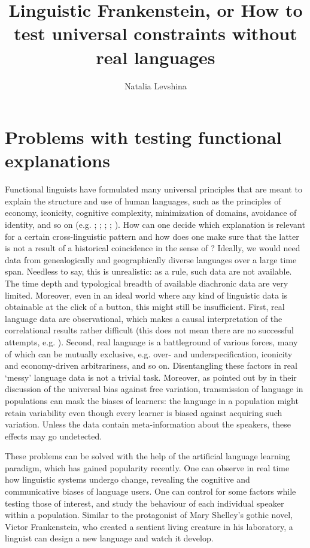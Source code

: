 \documentclass[output=paper]{langsci/langscibook}
\author{Natalia Levshina\affiliation{Leipzig University}}
\title{Linguistic {Frankenstein}, or {How} to test universal constraints without real languages}
\begin{document}
\maketitle 
 

\section{Problems with testing functional explanations}

Functional linguists have formulated many universal principles that are meant to explain the structure and use of human languages, such as the principles of economy, iconicity, cognitive complexity, minimization of domains, avoidance of identity, and so on (e.g. \citealt{Haiman1983}; \citealt{Rohdenburg1996}; \citealt{Rohdenburg2003}; \citealt{Hawkins2004}; \citealt{Haspelmath2008_FreqIcon}). How can one decide which explanation is relevant for a certain cross-linguistic pattern and how does one make sure that the latter is not a result of a historical coincidence in the sense of ? Ideally, we would need data from genealogically and geographically diverse languages over a large time span. Needless to say, this is unrealistic: as a rule, such data are not available. The time depth and typological breadth of available diachronic data are very limited. Moreover, even in an ideal world where any kind of linguistic data is obtainable at the click of a button, this might still be insufficient. First, real language data are observational, which makes a causal interpretation of the correlational results rather difficult (this does not mean there are no successful attempts, e.g. \citealt{Prado2014}). Second, real language is a battleground of various forces, many of which can be mutually exclusive, e.g. over- and underspecification, iconicity and economy-driven arbitrariness, and so on. Disentangling these factors in real ‘messy’ language data is not a trivial task. Moreover, as pointed out by \citet{SmithEtAl2017} in their discussion of the universal bias against free variation, transmission of language in populations can mask the biases of learners: the language in a population might retain variability even though every learner is biased against acquiring such variation. Unless the data contain meta-information about the speakers, these effects may go undetected.

These problems can be solved with the help of the artificial language learning paradigm, which has gained popularity recently. One can observe in real time how linguistic systems undergo change, revealing the cognitive and communicative biases of language users. One can control for some factors while testing those of interest, and study the behaviour of each individual speaker within a population. Similar to the protagonist of Mary Shelley’s gothic novel, Victor Frankenstein, who created a sentient living creature in his laboratory, a linguist can design a new language and watch it develop. 
\end{document}
